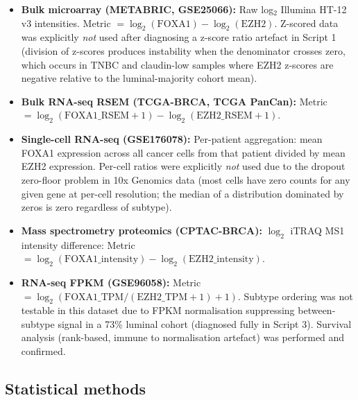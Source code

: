 \documentclass[12pt, a4paper]{article}
\begin{document}
\begin{itemize}
  \item \textbf{Bulk microarray (METABRIC, GSE25066):}
        Raw log$_2$ Illumina HT-12 v3 intensities.
        Metric $= \log_2(\text{FOXA1}) - \log_2(\text{EZH2})$.
        Z-scored data was explicitly \emph{not} used after
        diagnosing a z-score ratio artefact in Script 1
        (division of z-scores produces instability when the
        denominator crosses zero, which occurs in TNBC and
        claudin-low samples where EZH2 z-scores are negative
        relative to the luminal-majority cohort mean).

  \item \textbf{Bulk RNA-seq RSEM (TCGA-BRCA, TCGA PanCan):}
        Metric $= \log_2(\text{FOXA1\_RSEM}+1) -
        \log_2(\text{EZH2\_RSEM}+1)$.

  \item \textbf{Single-cell RNA-seq (GSE176078):}
        Per-patient aggregation: mean FOXA1 expression
        across all cancer cells from that patient divided
        by mean EZH2 expression. Per-cell ratios were
        explicitly \emph{not} used due to the dropout
        zero-floor problem in 10x Genomics data (most
        cells have zero counts for any given gene at
        per-cell resolution; the median of a distribution
        dominated by zeros is zero regardless of subtype).

  \item \textbf{Mass spectrometry proteomics (CPTAC-BRCA):}
        $\log_2$ iTRAQ MS1 intensity difference:
        Metric $= \log_2(\text{FOXA1\_intensity}) -
        \log_2(\text{EZH2\_intensity})$.

  \item \textbf{RNA-seq FPKM (GSE96058):}
        Metric $= \log_2(\text{FOXA1\_TPM} /
        (\text{EZH2\_TPM}+1) + 1)$.
        Subtype ordering was not testable in this dataset
        due to FPKM normalisation suppressing between-subtype
        signal in a 73\% luminal cohort (diagnosed fully in
        Script 3). Survival analysis (rank-based, immune to
        normalisation artefact) was performed and confirmed.
\end{itemize}

\subsection{Statistical methods}
\end{document}
